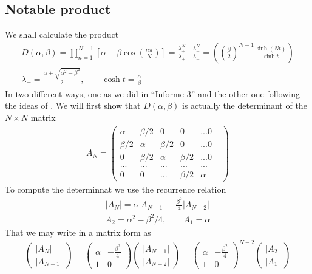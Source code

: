 \documentclass[12pt]{article}
\begin{document}
\subsection{Notable product}
We shall calculate the product
\begin{gather}
D(\alpha,\beta)=\prod_{n=1}^{N-1}\left[\alpha-\beta\cos\left(\frac{n\pi}{N}\right)\right]=\frac{\lambda_+^N-\lambda_-^N}{\lambda_+-\lambda_-}= \left(\left(\frac{\beta}{2}\right)^{N-1}\frac{\sinh(Nt)}{\sinh t}\right)\\
\lambda_\pm=\frac{\alpha\pm\sqrt{\alpha^2-\beta^2}}{2},\qquad \cosh t=\frac{\alpha}{\beta}\label{eq:prodNot}
\end{gather}
In two different ways, one as we did in ``Informe 3'' and the other one following the ideas of \cite{DupDav}.
We will first show that $D(\alpha,\beta)$ is actually the determinant of the $N\times N$ matrix
\begin{gather}
A_N=\left(\begin{matrix}
\alpha & \beta/2 & 0 & 0 & ...0 \\
\beta/2 & \alpha & \beta/2 & 0 & ...0 \\
0 & \beta/2 & \alpha & \beta/2 &  ... 0 \\
... & ... & ... &... &...& \\
0 & 0 &  ...& \beta/2 & \alpha
\end{matrix}\right)
\end{gather}
To compute the determinnat we use the recurrence relation
\begin{gather}
|A_N|=\alpha|A_{N-1}|-\frac{\beta^2}{4}|A_{N-2}|\\
A_2=\alpha^2-\beta^2/4,\qquad A_1=\alpha
\end{gather}
That we may write in a matrix form as
\begin{gather}
\left(\begin{matrix} |A_N|\\ |A_{N-1}| \end{matrix}\right)=
\left(\begin{matrix} \alpha & -\frac{\beta^2}{4}\\ 1 & 0\end{matrix}\right)
\left(\begin{matrix} |A_{N-1}|\\ |A_{N-2}| \end{matrix}\right)=
\left(\begin{matrix} \alpha & -\frac{\beta^2}{4}\\ 1 & 0\end{matrix}\right)^{N-2}\left(\begin{matrix} |A_{2}|\\ |A_{1}| \end{matrix}\right)
\end{gather}
\end{document}
